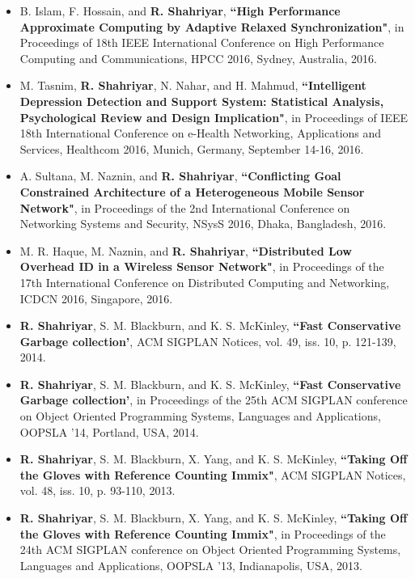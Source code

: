 \documentclass[letterpaper,11pt]{article}
\begin{document}
\begin{itemize}
\item B. Islam, F. Hossain, and {\bf R. Shahriyar}, {\color{black} \bf
    ``High Performance Approximate Computing by Adaptive Relaxed Synchronization"}, in Proceedings of 18th IEEE International Conference on High Performance Computing and Communications, HPCC 2016, Sydney, Australia, 2016.
        
\item M. Tasnim, {\bf R. Shahriyar}, N. Nahar, and H. Mahmud,  {\color{black} \bf
    ``Intelligent Depression Detection and Support System: Statistical Analysis, Psychological Review and Design Implication"}, in Proceedings of IEEE 18th International Conference on e-Health Networking, Applications and Services, Healthcom 2016, Munich, Germany, September 14-16, 2016.     

\item A. Sultana, M. Naznin, and {\bf R. Shahriyar}, {\color{black} \bf
    ``Conflicting Goal Constrained Architecture of a Heterogeneous Mobile Sensor Network"}, in Proceedings of the 2nd International Conference on Networking Systems and Security, NSysS 2016, Dhaka, Bangladesh, 2016.

\item M. R. Haque, M. Naznin, and {\bf R. Shahriyar}, {\color{black} \bf
    ``Distributed Low Overhead ID in a Wireless Sensor Network"}, in Proceedings of the 17th International Conference on Distributed Computing and Networking, ICDCN 2016, Singapore, 2016.

\item {\bf R. Shahriyar}, S. M. Blackburn, and K. S. McKinley,  {\color{black} \bf
    ``Fast Conservative Garbage collection'}, ACM SIGPLAN Notices, 
vol. 49, iss. 10, p. 121-139, 2014.

\item {\bf R. Shahriyar}, S. M. Blackburn, and K. S. McKinley,  {\color{black} \bf
    ``Fast Conservative Garbage collection'}, in Proceedings of the 25th ACM SIGPLAN conference on Object Oriented Programming Systems, Languages and Applications, OOPSLA '14, Portland, USA, 2014.

\item {\bf R. Shahriyar}, S. M. Blackburn, X. Yang, and K. S. McKinley, {\color{black} \bf
    ``Taking Off the Gloves with Reference Counting Immix"},  ACM SIGPLAN Notices, 
vol. 48, iss. 10, p. 93-110, 2013.

\item {\bf R. Shahriyar}, S. M. Blackburn, X. Yang, and K. S. McKinley, {\color{black} \bf
    ``Taking Off the Gloves with Reference Counting Immix"},  in Proceedings of the 24th ACM SIGPLAN conference on Object Oriented Programming Systems, Languages and Applications, OOPSLA '13, Indianapolis, USA, 2013.


\end{itemize}
\end{document}
